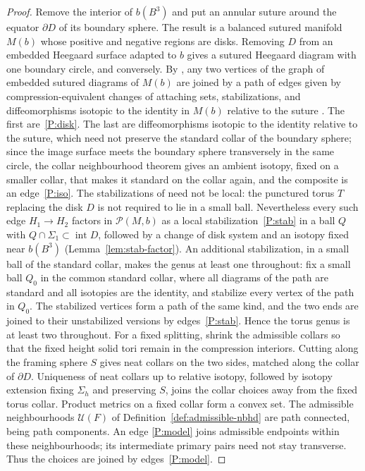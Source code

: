 \documentclass[11pt]{amsart}
\theoremstyle{definition}
\theoremstyle{remark}
\theoremstyle{plain}
\numberwithin{equation}{section}
\newcommand{\cP}{\mathcal{P}}
\begin{document}
\begin{proof}
Remove the interior of $b(B^3)$ and put an annular suture around the
equator $\partial D$ of its boundary sphere. The result is a balanced
sutured manifold $M(b)$ whose positive and negative regions are disks.
Removing $D$ from an embedded Heegaard surface adapted to $b$ gives a
sutured Heegaard diagram with one boundary circle, and conversely. By
\cite[Definitions~2.34--2.35, Proposition~2.36]{JTZ}, any two vertices of the graph of embedded
sutured diagrams of $M(b)$ are joined by a path of edges given by
compression-equivalent changes of attaching sets, stabilizations, and
diffeomorphisms isotopic to the identity in $M(b)$ relative to the
suture \cite[Definition~2.34]{JTZ}. The first are~\ref{P:disk}. The last are
diffeomorphisms isotopic to the identity relative to the suture, which need
not preserve the standard collar of the boundary sphere; since the image
surface meets the boundary sphere transversely in the same circle, the collar
neighbourhood theorem gives an ambient isotopy, fixed on a smaller collar, that
makes it standard on the collar again, and the composite is an edge~\ref{P:iso}. The
stabilizations of \cite[Definition~2.18]{JTZ} need not be local: the
punctured torus $T$ replacing the disk $D$ is not required to lie in a
small ball. Nevertheless every such edge $H_1\to H_2$ factors in
$\cP(M,b)$ as a local stabilization~\ref{P:stab} in a ball $Q$ with $Q\cap
\Sigma_1\subset\operatorname{int}D$, followed by a change of disk system and
an isotopy fixed near $b(B^3)$ (Lemma~\ref{lem:stab-factor}). An additional stabilization, in a small ball of the standard collar, makes the genus at least one throughout: fix a small ball $Q_0$
in the common standard collar, where all diagrams of the path are standard and
all isotopies are the identity, and stabilize every vertex of the path in
$Q_0$. The stabilized vertices form a path of the same kind, and the two ends
are joined to their unstabilized versions by edges~\ref{P:stab}. Hence the
torus genus is at least two throughout. For a fixed splitting,
shrink the admissible collars so that the fixed height solid tori
remain in the compression interiors. Cutting along the framing
sphere $S$ gives neat collars on the two sides, matched along the
collar of $\partial D$. Uniqueness of neat collars up to relative
isotopy, followed by isotopy extension fixing $\Sigma_h$ and
preserving $S$, joins the collar choices away from the fixed torus
collar. Product metrics on a fixed collar form a convex set. The admissible
neighbourhoods $\mathcal U(F)$ of Definition~\ref{def:admissible-nbhd} are path connected,
being path components. An edge
\ref{P:model} joins admissible endpoints within these neighbourhoods;
its intermediate primary pairs need not stay transverse. Thus the
choices are joined by edges~\ref{P:model}.
\end{proof}
\end{document}
